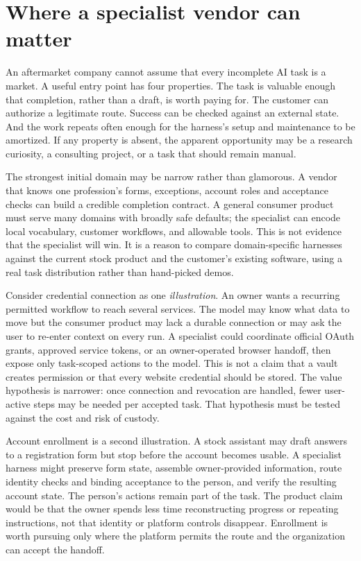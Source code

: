 \section{Where a specialist vendor can matter}

An aftermarket company cannot assume that every incomplete AI task is a market. A useful entry point has four properties. The task is valuable enough that completion, rather than a draft, is worth paying for. The customer can authorize a legitimate route. Success can be checked against an external state. And the work repeats often enough for the harness's setup and maintenance to be amortized. If any property is absent, the apparent opportunity may be a research curiosity, a consulting project, or a task that should remain manual.

The strongest initial domain may be narrow rather than glamorous. A vendor that knows one profession's forms, exceptions, account roles and acceptance checks can build a credible completion contract. A general consumer product must serve many domains with broadly safe defaults; the specialist can encode local vocabulary, customer workflows, and allowable tools. This is not evidence that the specialist will win. It is a reason to compare domain-specific harnesses against the current stock product and the customer's existing software, using a real task distribution rather than hand-picked demos.

Consider credential connection as one \emph{illustration}. An owner wants a recurring permitted workflow to reach several services. The model may know what data to move but the consumer product may lack a durable connection or may ask the user to re-enter context on every run. A specialist could coordinate official OAuth grants, approved service tokens, or an owner-operated browser handoff, then expose only task-scoped actions to the model. This is not a claim that a vault creates permission or that every website credential should be stored. The value hypothesis is narrower: once connection and revocation are handled, fewer user-active steps may be needed per accepted task. That hypothesis must be tested against the cost and risk of custody.

Account enrollment is a second illustration. A stock assistant may draft answers to a registration form but stop before the account becomes usable. A specialist harness might preserve form state, assemble owner-provided information, route identity checks and binding acceptance to the person, and verify the resulting account state. The person’s actions remain part of the task. The product claim would be that the owner spends less time reconstructing progress or repeating instructions, not that identity or platform controls disappear. Enrollment is worth pursuing only where the platform permits the route and the organization can accept the handoff.

